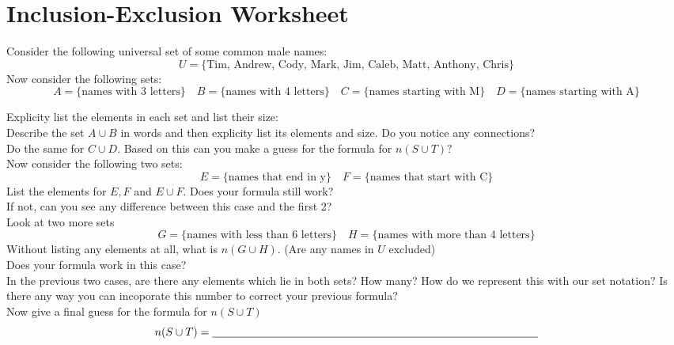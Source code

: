 \documentclass[14,fleqn]{article}
\begin{document}
\section*{Inclusion-Exclusion Worksheet}
Consider the following universal set of some common male names:
\[
	U=\{\text{Tim, Andrew, Cody, Mark, Jim, Caleb, Matt, Anthony, Chris}\}
\]
Now consider the following sets:
\[
	A=\{\text{names with 3 letters}\}\quad B=\{\text{names with 4 letters}\} \quad C=\{\text{names starting with M}\} \quad D=\{\text{names starting with A}\}
\]

Explicity list the elements in each set and list their size:\\[.8 in]

Describe the set $A\cup B$ in words and then explicity list its elements and size. Do you notice any connections?\\[.8 in]

Do the same for $C\cup D$. Based on this can you make a guess for the formula for $n(S\cup T)?$\\[.8 in]

Now consider the following two sets:
\[
	E=\{\text{names that end in y}\}\quad F=\{\text{names that start with C}\}
\]
List the elements for $E,F$ and $E\cup F.$ Does your formula still work?\\
If not, can you see any difference between this case and the first 2?\\[.4 in]

Look at two more sets
\[
	G=\{\text{names with less than 6 letters}\}\quad H=\{\text{names with more than 4 letters}\}
\]
Without listing any elements at all, what is $n(G\cup H).$ (Are any names in $U$ excluded)\\
Does your formula work in this case?\\[.2 in]

In the previous two cases, are there any elements which lie in both sets? How many? How do we represent this with our set notation? Is there any way you can incoporate this number to correct your previous formula?\\[.5 in]

Now give a final guess for the formula for $n(S\cup T)$
\[
	n(S\cup T)=\underline{\ \hspace{4 in}\ }
\]
\end{document}
